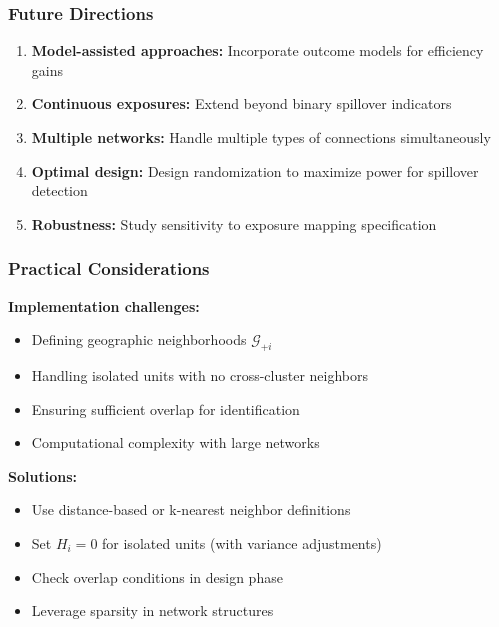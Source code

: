 \documentclass{beamer}
\newcommand{\cG}{\mathcal{G}}
\begin{document}
\begin{frame}
\frametitle{Future Directions}
\begin{enumerate}
\item \textbf{Model-assisted approaches:} Incorporate outcome models for efficiency gains

\item \textbf{Continuous exposures:} Extend beyond binary spillover indicators

\item \textbf{Multiple networks:} Handle multiple types of connections simultaneously

\item \textbf{Optimal design:} Design randomization to maximize power for spillover detection

\item \textbf{Robustness:} Study sensitivity to exposure mapping specification
\end{enumerate}
\end{frame}

\begin{frame}
\frametitle{Practical Considerations}
\textbf{Implementation challenges:}
\begin{itemize}
\item Defining geographic neighborhoods $\cG_{+i}$
\item Handling isolated units with no cross-cluster neighbors
\item Ensuring sufficient overlap for identification
\item Computational complexity with large networks
\end{itemize}

\vspace{0.5cm}
\textbf{Solutions:}
\begin{itemize}
\item Use distance-based or k-nearest neighbor definitions
\item Set $H_i = 0$ for isolated units (with variance adjustments)
\item Check overlap conditions in design phase
\item Leverage sparsity in network structures
\end{itemize}
\end{frame}
\end{document}

